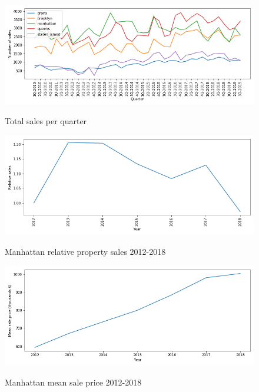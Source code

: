 \begin{figure}[H]
    \centering
    \scalebox{0.5}  
    {\includegraphics{figs/sales_by_borough_per_quarter.png}}
    \caption{Total sales per quarter}
    \label{sales_quarter_borough}
\end{figure}

\begin{figure}[H]
    \centering
    \scalebox{0.5}  
    {\includegraphics{figs/manhattan_relative_sales.png}}
    \caption{Manhattan relative property sales 2012-2018}
    \label{manhattan_relative_sales}
\end{figure}

\begin{figure}[H]
    \centering
    \scalebox{0.5}  
    {\includegraphics{figs/manhattan_mean_sale_price.png}}
    \caption{Manhattan mean sale price 2012-2018}
    \label{manhattan_mean_sale_price}
\end{figure}

